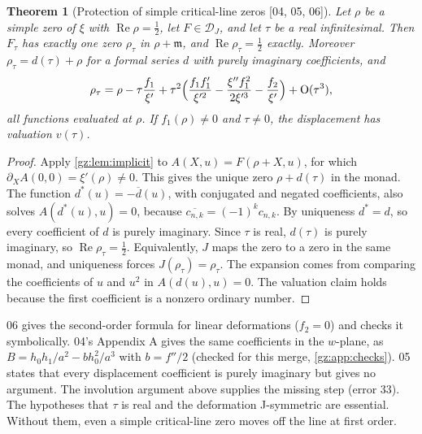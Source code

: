 \documentclass[11pt,a4paper]{article}
\numberwithin{equation}{section}
\newtheorem{theorem}{Theorem}[section]
\theoremstyle{definition}
\theoremstyle{remark}
\newcommand{\mm}{\mathfrak m}
\renewcommand{\Re}{\operatorname{Re}}
\newcommand{\DJs}{\mathcal D_{J}}
\newcommand{\src}[1]{\textup{[#1]}}
\newcommand{\bigO}{\mathrm{O}}
\begin{document}
\begin{theorem}[Protection of simple critical-line zeros \src{04, 05, 06}]\label{gz:thm:protection}
Let $\rho$ be a simple zero of $\xi$ with $\Re\rho=\tfrac12$, let
$F\in\DJs$, and let $\tau$ be a real infinitesimal. Then $F_\tau$ has exactly
one zero $\rho_\tau$ in $\rho+\mm$, and $\Re\rho_\tau=\tfrac12$ exactly.
Moreover $\rho_\tau=d(\tau)+\rho$ for a formal series $d$ with purely
imaginary coefficients, and
\[
\rho_\tau=\rho-\tau\frac{f_1}{\xi'}+\tau^2\Bigl(\frac{f_1f_1'}{\xi'^2}-\frac{\xi''f_1^2}{2\xi'^3}-\frac{f_2}{\xi'}\Bigr)+\bigO(\tau^3),
\]
all functions evaluated at $\rho$. If $f_1(\rho)\ne0$ and $\tau\ne0$, the
displacement has valuation $v(\tau)$.
\end{theorem}
\begin{proof}
Apply \cref{gz:lem:implicit} to $A(X,u)=F(\rho+X,u)$, for which
$\partial_XA(0,0)=\xi'(\rho)\ne0$. This gives the unique zero
$\rho+d(\tau)$ in the monad. The function $d^*(u)=-\overline{d}(u)$, with
conjugated and negated coefficients, also solves $A(d^*(u),u)=0$, because
$\overline{c_{n,k}}=(-1)^kc_{n,k}$. By uniqueness $d^*=d$, so every
coefficient of $d$ is purely imaginary. Since $\tau$ is real, $d(\tau)$ is
purely imaginary, so $\Re\rho_\tau=\tfrac12$. Equivalently, $J$ maps the
zero to a zero in the same monad, and uniqueness forces $J(\rho_\tau)=\rho_\tau$.
The expansion comes from comparing the coefficients of $u$ and $u^2$ in
$A(d(u),u)=0$. The valuation claim holds because the first coefficient is
a nonzero ordinary number.
\end{proof}
06 gives the second-order formula for linear deformations ($f_2=0$) and
checks it symbolically. 04's Appendix A gives the same coefficients in the
$w$-plane, as $B=h_0h_1/a^2-bh_0^2/a^3$ with $b=f''/2$ (checked for this
merge, \cref{gz:app:checks}). 05 states that every displacement coefficient
is purely imaginary but gives no argument. The involution argument above
supplies the missing step (error 33). The hypotheses that $\tau$ is real and
the deformation J-symmetric are essential. Without them, even a simple
critical-line zero moves off the line at first order.
\end{document}
